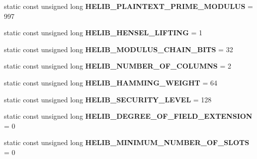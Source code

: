 \begin{DoxyCompactItemize}
\item 
\mbox{\label{classhomomorphine_1_1_constants_a25426ff47774d7ff0b88a0f7af1cfbb5}} 
static const unsigned long {\bfseries H\+E\+L\+I\+B\+\_\+\+P\+L\+A\+I\+N\+T\+E\+X\+T\+\_\+\+P\+R\+I\+M\+E\+\_\+\+M\+O\+D\+U\+L\+US} = 997
\item 
\mbox{\label{classhomomorphine_1_1_constants_a1392b13d6e1546225b95928311e53e85}} 
static const unsigned long {\bfseries H\+E\+L\+I\+B\+\_\+\+H\+E\+N\+S\+E\+L\+\_\+\+L\+I\+F\+T\+I\+NG} = 1
\item 
\mbox{\label{classhomomorphine_1_1_constants_a0dff16e6343989a60f4833605e45525f}} 
static const unsigned long {\bfseries H\+E\+L\+I\+B\+\_\+\+M\+O\+D\+U\+L\+U\+S\+\_\+\+C\+H\+A\+I\+N\+\_\+\+B\+I\+TS} = 32
\item 
\mbox{\label{classhomomorphine_1_1_constants_af08d97d4333bf772d742dddb6cac3af7}} 
static const unsigned long {\bfseries H\+E\+L\+I\+B\+\_\+\+N\+U\+M\+B\+E\+R\+\_\+\+O\+F\+\_\+\+C\+O\+L\+U\+M\+NS} = 2
\item 
\mbox{\label{classhomomorphine_1_1_constants_a86e3b8595c5ea2ed0be83f454dcc22d9}} 
static const unsigned long {\bfseries H\+E\+L\+I\+B\+\_\+\+H\+A\+M\+M\+I\+N\+G\+\_\+\+W\+E\+I\+G\+HT} = 64
\item 
\mbox{\label{classhomomorphine_1_1_constants_a043276f012d91267f62249aee29dfc04}} 
static const unsigned long {\bfseries H\+E\+L\+I\+B\+\_\+\+S\+E\+C\+U\+R\+I\+T\+Y\+\_\+\+L\+E\+V\+EL} = 128
\item 
\mbox{\label{classhomomorphine_1_1_constants_aac8aee7a978989ff544b02f8534fff24}} 
static const unsigned long {\bfseries H\+E\+L\+I\+B\+\_\+\+D\+E\+G\+R\+E\+E\+\_\+\+O\+F\+\_\+\+F\+I\+E\+L\+D\+\_\+\+E\+X\+T\+E\+N\+S\+I\+ON} = 0
\item 
\mbox{\label{classhomomorphine_1_1_constants_a94ae2d93d643d610ef822f8a06dde37f}} 
static const unsigned long {\bfseries H\+E\+L\+I\+B\+\_\+\+M\+I\+N\+I\+M\+U\+M\+\_\+\+N\+U\+M\+B\+E\+R\+\_\+\+O\+F\+\_\+\+S\+L\+O\+TS} = 0
\end{DoxyCompactItemize}


